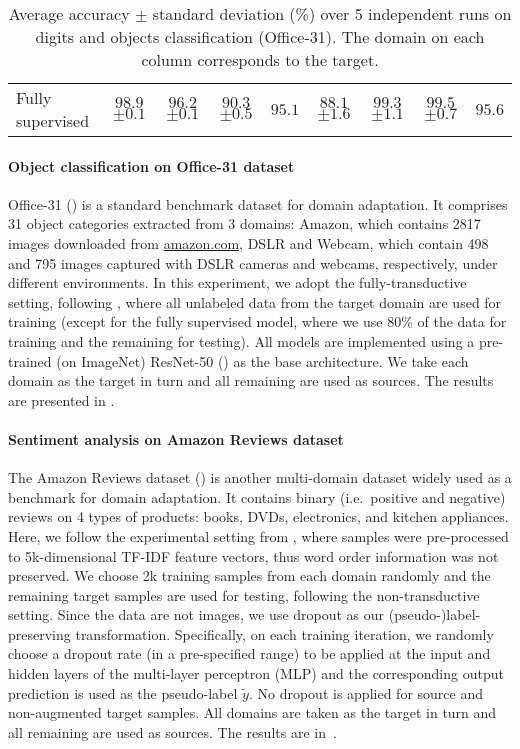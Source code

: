 \begin{table}
{\begin{tabular}{l|ccc:c|ccc:c}
		Fully supervised            & $ 98.9 $ \tiny{$ \pm 0.1 $}  & $ 96.2 $ \tiny{$ \pm 0.1 $}   & $ 90.3 $ \tiny{$ \pm 0.5 $} & $95.1$ & $ 88.1 $ \tiny{$ \pm 1.6 $}   & $ 99.3 $ \tiny{$ \pm 1.1 $}       & $ 99.5 $ \tiny{$ \pm 0.7 $} & $95.6$
	\end{tabular}}
	\caption{Average accuracy $\pm$ standard deviation (\%) over 5 independent runs on digits and objects classification (Office-31). The domain on each column corresponds to the target.}
	\label{tab:digits_office_acc}
\end{table}

\paragraph{Object classification on Office-31 dataset} Office-31 (\citet{Saenko2010}) is a standard benchmark dataset for domain adaptation. It comprises 31 object categories extracted from 3 domains: Amazon, which contains 2817 images downloaded from \url{amazon.com}, DSLR and Webcam, which contain 498 and 795 images captured with DSLR cameras and webcams, respectively, under different environments. In this experiment, we adopt the fully-transductive setting, following \citet{Pei2018}, where all unlabeled data from the target domain are used for training (except for the fully supervised model, where we use 80\% of the data for training and the remaining for testing). All models are implemented using a pre-trained (on ImageNet) ResNet-50 (\citet{He2016}) as the base architecture. We take each domain as the target in turn and all remaining are used as sources. The results are presented in .

\paragraph{Sentiment analysis on Amazon Reviews dataset} The Amazon Reviews dataset (\citet{Blitzer2007}) is another multi-domain dataset widely used as a benchmark for domain adaptation. It contains binary (i.e.\ positive and negative) reviews on 4 types of products: books, DVDs, electronics, and kitchen appliances. Here, we follow the experimental setting from \citet{Chen2012}, where samples were pre-processed to 5k-dimensional TF-IDF feature vectors, thus word order information was not preserved. We choose 2k training samples from each domain randomly and the remaining target samples are used for testing, following the non-transductive setting. Since the data are not images, we use dropout as our (pseudo-)label-preserving transformation. Specifically, on each training iteration, we randomly choose a dropout rate (in a pre-specified range) to be applied at the input and hidden layers of the multi-layer perceptron (MLP) and the corresponding output prediction is used as the pseudo-label $\tilde{y}$. No dropout is applied for source and non-augmented target samples. All domains are taken as the target in turn and all remaining are used as sources. The results are in~.

